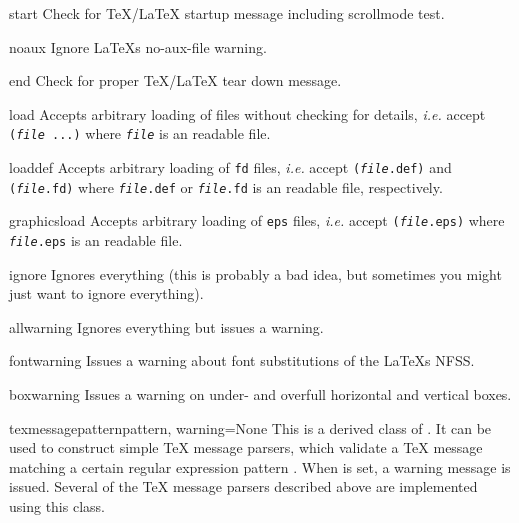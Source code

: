 \begin{memberdesc}{start}
  Check for \TeX/\LaTeX{} startup message including scrollmode test.
\end{memberdesc}
\begin{memberdesc}{noaux}
  Ignore \LaTeX{}s no-aux-file warning.
\end{memberdesc}
\begin{memberdesc}{end}
  Check for proper \TeX/\LaTeX{} tear down message.
\end{memberdesc}
\begin{memberdesc}{load}
  Accepts arbitrary loading of files without checking for details,
  \emph{i.e.} accept \texttt{(\emph{file} ...)} where
  \texttt{\emph{file}} is an readable file.
\end{memberdesc}
\begin{memberdesc}{loaddef}
  Accepts arbitrary loading of \texttt{fd} files, \emph{i.e.} accept
  \texttt{(\emph{file}.def)} and \texttt{(\emph{file}.fd)} where
  \texttt{\emph{file}.def} or \texttt{\emph{file}.fd} is an readable
  file, respectively.
\end{memberdesc}
\begin{memberdesc}{graphicsload}
  Accepts arbitrary loading of \texttt{eps} files,
  \emph{i.e.} accept \texttt{(\emph{file}.eps)} where
  \texttt{\emph{file}.eps} is an readable file.
\end{memberdesc}
\begin{memberdesc}{ignore}
  Ignores everything (this is probably a bad idea, but sometimes you
  might just want to ignore everything).
\end{memberdesc}
\begin{memberdesc}{allwarning}
  Ignores everything but issues a warning.
\end{memberdesc}
\begin{memberdesc}{fontwarning}
  Issues a warning about font substitutions of the \LaTeX{}s NFSS.
\end{memberdesc}
\begin{memberdesc}{boxwarning}
  Issues a warning on under- and overfull horizontal and vertical boxes.
\end{memberdesc}

\begin{classdesc}{texmessagepattern}{pattern, warning=None}
  This is a derived class of . It can be used to
  construct simple \TeX{} message parsers, which validate a \TeX{}
  message matching a certain regular expression pattern .
  When  is set, a warning message is issued. Several of
  the \TeX{} message parsers described above are implemented using
  this class.
\end{classdesc}

